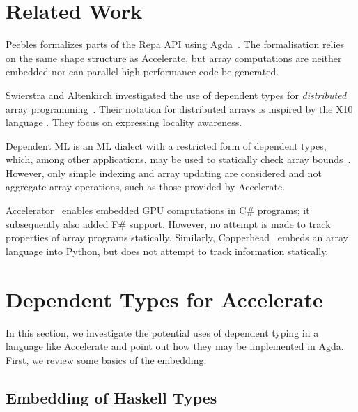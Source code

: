 \documentclass{llncs}
\begin{document}
\section{Related Work}
\label{sec:related-work}

Peebles formalizes parts of the Repa API %
using Agda~\cite{peebles:derpa}. The formalisation relies on the same
shape structure as Accelerate, but array computations are neither
embedded nor can parallel high-performance code be generated. 

Swierstra and Altenkirch investigated the use of dependent types for
\emph{distributed} array
programming~\cite{swierstra-altenkirch:dep-types-for-distr-arrays,swierstra:more-dependent-types}.
Their notation for distributed arrays is inspired by the X10 language
\cite{Saraswat2009}. They focus on expressing locality awareness.

Dependent ML is an ML dialect with a restricted form of dependent types, which, among other applications, may be used to statically check array bounds~\cite{xi:dml-jfp}. However, only simple indexing and array updating are considered and not aggregate array operations, such as those provided by Accelerate.

Accelerator~\cite{Tarditi:2006} enables embedded GPU computations in C\# programs; it subsequently also added F\# support. However, no attempt is made to track properties of array programs statically. Similarly, Copperhead~\cite{Catanzaro:EECS-2010-124} embeds an array language into Python, but does not attempt to track information statically.

\section{Dependent Types for Accelerate}
\label{sec:dependent-types}

In this section, we investigate the potential uses of dependent typing
in a language like Accelerate and point out how they may be
implemented in Agda. First, we review some basics of the
embedding. 

\subsection{Embedding of Haskell Types}
\label{sec:embedding-types}
\end{document}
